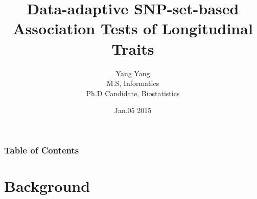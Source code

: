 \documentclass[compress]{beamer}
\begin{document}
\title[] %
{Data-adaptive SNP-set-based Association Tests of Longitudinal Traits}
\author[ Yang Yang] %
{
Yang Yang\\
M.S, Informatics\\
Ph.D Candidate, Biostatistics
}
\date[Jan.5 2015] %
{Jan.05 2015}


\frame{\titlepage}


\begin{frame}
\frametitle{Table of Contents}
\small
\tableofcontents
\end{frame}


\section{Background}
\end{document}
